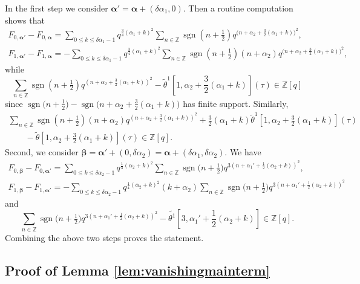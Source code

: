 \documentclass[pdftex]{sigma}
\newcommand{\ZZ}{\mathbb{Z}}
\def\bal{\boldsymbol{\alpha}}
\def\bb{\boldsymbol{\beta}}
\def\t{\tau}
\theoremstyle{definition}
\numberwithin{equation}{section}
\begin{document}
In the first step we consider ${\bal '}=\bal + (\delta \alpha_1,0)$. Then a routine computation shows that
\begin{gather*}
F_{0,\bal' }- F_{0,\bal}= \sum_{0\leq k\leq \delta \alpha_1 -1} q^{\frac{3}{4}(\alpha_1 +k)^2} \sum_{n\in \ZZ} \operatorname{sgn}(n+\tfrac{1}{2}) q^{\bigl(n+\alpha_2+\frac{3}{2}(\alpha_1 +k)\bigr)^2},\\
F_{1,\bal' }- F_{1,\bal}= -\sum_{0\leq k\leq \delta \alpha_1 -1} q^{\frac{3}{4}(\alpha_1 +k)^2} \sum_{n\in \ZZ} \operatorname{sgn}(n+\tfrac{1}{2}) (n+\alpha_2)q^{\bigl(n+\alpha_2+\frac{3}{2}(\alpha_1 +k)\bigr)^2},
\end{gather*}
while
\[
\sum_{n\in \ZZ} \operatorname{sgn}(n+\tfrac{1}{2}) q^{(n+\alpha_2+\tfrac{3}{2}(\alpha_1 +k))^2} - {\tilde\theta}^1\left[1,\alpha_2+\frac{3}{2}(\alpha_1 +k)\right](\t) \in \ZZ[q]
\]
since $ \operatorname{sgn}\bigl(n+\tfrac{1}{2}\bigr)- \operatorname{sgn}\bigl(n+\alpha_2+\tfrac{3}{2}(\alpha_1 +k)\bigr)$ has finite support. Similarly,
\begin{gather*}
\sum_{n\in \ZZ} \operatorname{sgn}\left(n+\tfrac{1}{2}\right) (n+\alpha_2)q^{(n+\alpha_2+\tfrac{3}{2}(\alpha_1 +k))^2} + \frac{3}{2}(\alpha_1 +k){\tilde\theta}^1\left[1,\alpha_2+\frac{3}{2}(\alpha_1 +k)\right](\t)\\
\qquad {}- {\tilde\theta}\left[1,\alpha_2+\frac{3}{2}(\alpha_1 +k)\right](\t) \in \ZZ[q] .
\end{gather*}
Second, we consider $\bb= {\bal '}+ (0,\delta \alpha_2) =\bal + (\delta \alpha_1,\delta \alpha_2)$. We have
\begin{gather*}
F_{0,\bb}- F_{0,\bal'}= \sum_{0\leq k\leq \delta \alpha_2 -1} q^{\frac{1}{4}(\alpha_2 +k)^2} \sum_{n\in \ZZ} \operatorname{sgn}\bigl(n+\tfrac{1}{2}\bigr) q^{3(n+\alpha_1'+\frac{1}{2}(\alpha_2 +k))^2},\\
F_{1,\bb}- F_{1,\bal'}= -\sum_{0\leq k\leq \delta \alpha_2 -1} q^{\frac{1}{4}(\alpha_2 +k)^2} (k+\alpha_2) \sum_{n\in \ZZ} \operatorname{sgn}\bigl(n+\tfrac{1}{2}\bigr) q^{3(n+\alpha_1'+\frac{1}{2}(\alpha_2 +k))^2}
\end{gather*}
and
\[
\sum_{n\in \ZZ} \operatorname{sgn}\bigl(n+\tfrac{1}{2}\bigr) q^{3(n+\alpha_1'+\frac{1}{2}(\alpha_2 +k))^2} - \tilde{\theta^1}\left[3,\alpha_1'+\frac{1}{2}(\alpha_2 +k)\right] \in \ZZ[q].
\]
Combining the above two steps proves the statement.

\subsection{Proof of Lemma \ref{lem:vanishingmainterm}}
\label{pf_lem:vanishingmainterm}
\end{document}
